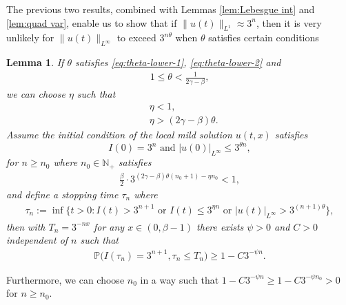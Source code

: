 \documentclass[12pt]{article}
\newtheorem{lemma}[theorem]{Lemma}
\numberwithin{equation}{section}
\begin{document}
The previous two results, combined with Lemmas \ref{lem:Lebesgue int} and  \ref{lem:quad var}, enable us to show that if $\|u(t)\|_{L^1} \approx 3^n$, then it is very unlikely for $\|u(t)\|_{L^\infty}$ to exceed $3^{n\theta}$ when $\theta$ satisfies certain conditions
\begin{lemma}\label{lem: prob of I triples}
    If $\theta$ satisfies \eqref{eq:theta-lower-1}, \eqref{eq:theta-lower-2} and
    \begin{align}
        1\leq \theta< \frac{1}{2\gamma-\beta}, \label{eq:theta-upper}
    \end{align}
    we can choose $\eta$ such that
   \begin{align}
    & \eta<1, \label{eq:eta-upper}\\
    & \eta>(2\gamma-\beta)\theta. \label{eq:eta-lower}
   \end{align}
   Assume the initial condition of the local mild solution $u(t,x)$ satisfies
	\begin{equation}
	I(0) = 3^n \text{ and } |u(0)|_{L^\infty} \leq 3^{\theta n},\label{eq:initial condition case 2}
\end{equation}
for $n\geq n_0$ where $n_0\in \mathbb{N}_+$ satisfies
\begin{align}
    \frac{\beta}{2}\cdot 3^{(2\gamma-\beta)\theta(n_0+1)-\eta n_0}<1,\label{ineq: assumption for n0}
\end{align}
and define a stopping time $\tau_n$ where
    \begin{align}
    \tau_n:=\inf\{t>0: I(t)> 3^{n+1} \text{ or }I(t)\leq 3^{\eta n}\text{ or } |u(t)|_{L^\infty}> 3^{(n+1)\theta}\},\label{def:tau_n case 2}
    \end{align}
then with $T_n=3^{-nx}$ for any $x\in (0,\beta-1)$ there exists $\psi>0$ and $C>0$ independent of $n$ such that
    \begin{align}
        \mathbb{P}\Big(I(\tau_n)=3^{n+1},\tau_n\leq T_n\Big)\geq 1 -C 3^{-\psi n}.
    \end{align}
\end{lemma}
Furthermore, we can choose $n_0$ in a way such that $1-C3^{-\psi n}\geq 1-C3^{-\psi n_0}>0$ for $n\geq n_0$.
\end{document}
